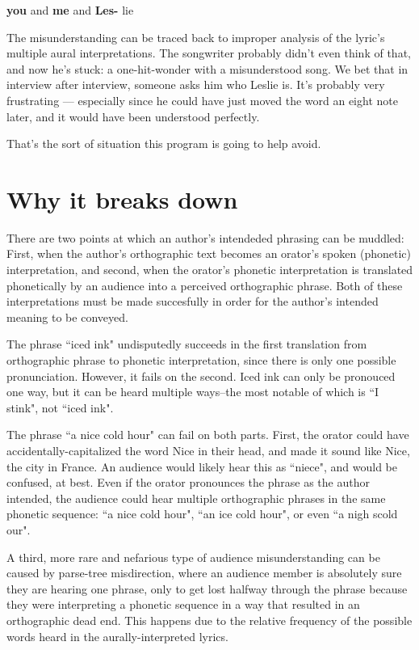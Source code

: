 \begin{center}
{\large \textbf{you }}{\large and }{\large \textbf{me }}{\large and }{\large \textbf{Les- 
}}{\large lie}
\end{center}

The misunderstanding can be traced back to improper analysis of the lyric's multiple aural interpretations. The songwriter probably didn't even think of that, and now he's stuck: a one-hit-wonder with a misunderstood song. We bet that in interview after interview, someone asks him who Leslie is. It's probably very frustrating --- especially since he could have just moved the word an eight note later, and it would have been understood perfectly.

That's the sort of situation this program is going to help avoid.



\section{ Why it breaks down }
\label{sect:whyItBreaksDown}

There are two points at which an author's intendeded phrasing can be muddled: First, when the author's orthographic text becomes an orator's spoken (phonetic) interpretation, and second, when the orator's phonetic interpretation is translated phonetically by an audience into a perceived orthographic phrase. Both of these interpretations must be made succesfully in order for the author's intended meaning to be conveyed.

The phrase ``iced ink" undisputedly succeeds in the first translation from orthographic phrase to phonetic interpretation, since there is only one possible pronunciation. However, it fails on the second.  Iced ink can only be pronouced one way, but it can be heard multiple ways--the most notable of which is ``I stink", not ``iced ink".

The phrase ``a nice cold hour" can fail on both parts.  First, the orator could have accidentally-capitalized the word Nice in their head, and made it sound like Nice, the city in France.  An audience would likely hear this as ``niece", and would be confused, at best.  Even if the orator pronounces the phrase as the author intended, the audience could hear multiple orthographic phrases in the same phonetic sequence: ``a nice cold hour", ``an ice cold hour", or even ``a nigh scold our".

A third, more rare and nefarious type of audience misunderstanding can be caused by parse-tree misdirection, where an audience member is absolutely sure they are hearing one phrase, only to get lost halfway through the phrase because they were interpreting a phonetic sequence in a way that resulted in an orthographic dead end. This happens due to the relative frequency of the possible words heard in the aurally-interpreted lyrics.


